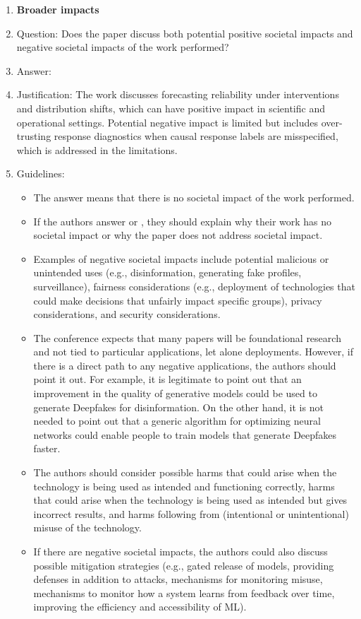 \begin{enumerate}
\item {\bf Broader impacts}
    \item[] Question: Does the paper discuss both potential positive societal impacts and negative societal impacts of the work performed?
    \item[] Answer: \answerYes{}
    \item[] Justification: The work discusses forecasting reliability under interventions and distribution shifts, which can have positive impact in scientific and operational settings. Potential negative impact is limited but includes over-trusting response diagnostics when causal response labels are misspecified, which is addressed in the limitations.
    \item[] Guidelines:
    \begin{itemize}
        \item The answer \answerNA{} means that there is no societal impact of the work performed.
        \item If the authors answer \answerNA{} or \answerNo, they should explain why their work has no societal impact or why the paper does not address societal impact.
        \item Examples of negative societal impacts include potential malicious or unintended uses (e.g., disinformation, generating fake profiles, surveillance), fairness considerations (e.g., deployment of technologies that could make decisions that unfairly impact specific groups), privacy considerations, and security considerations.
        \item The conference expects that many papers will be foundational research and not tied to particular applications, let alone deployments. However, if there is a direct path to any negative applications, the authors should point it out. For example, it is legitimate to point out that an improvement in the quality of generative models could be used to generate Deepfakes for disinformation. On the other hand, it is not needed to point out that a generic algorithm for optimizing neural networks could enable people to train models that generate Deepfakes faster.
        \item The authors should consider possible harms that could arise when the technology is being used as intended and functioning correctly, harms that could arise when the technology is being used as intended but gives incorrect results, and harms following from (intentional or unintentional) misuse of the technology.
        \item If there are negative societal impacts, the authors could also discuss possible mitigation strategies (e.g., gated release of models, providing defenses in addition to attacks, mechanisms for monitoring misuse, mechanisms to monitor how a system learns from feedback over time, improving the efficiency and accessibility of ML).
    \end{itemize}
    

\end{enumerate}
